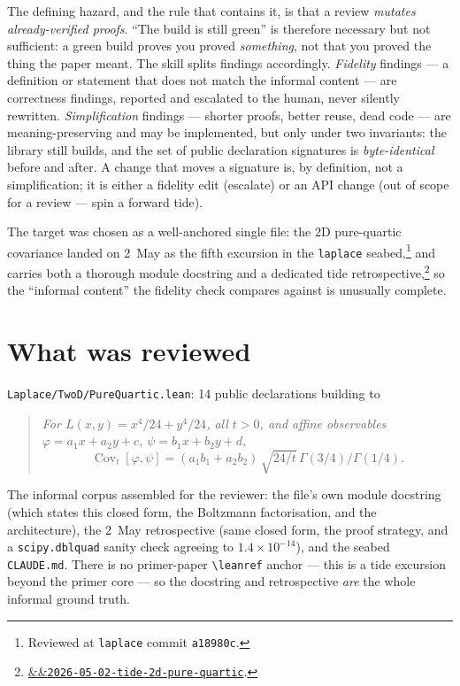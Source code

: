 \documentclass[11pt]{article}
\newcommand{\tideref}[2][]{\href{https://therisensea.org/tides/#2/}{\ifx&#1&\texttt{#2}\else#1\fi}}
\begin{document}
The defining hazard, and the rule that contains it, is that a review \emph{mutates
already-verified proofs}. ``The build is still green'' is therefore necessary but
not sufficient: a green build proves you proved \emph{something}, not that you
proved the thing the paper meant. The skill splits findings accordingly.
\emph{Fidelity} findings --- a definition or statement that does not match the
informal content --- are correctness findings, reported and escalated to the
human, never silently rewritten. \emph{Simplification} findings --- shorter
proofs, better reuse, dead code --- are meaning-preserving and may be implemented,
but only under two invariants: the library still builds, and the set of public
declaration signatures is \emph{byte-identical} before and after. A change that
moves a signature is, by definition, not a simplification; it is either a fidelity
edit (escalate) or an API change (out of scope for a review --- spin a forward
tide).

The target was chosen as a well-anchored single file: the 2D pure-quartic
covariance landed on 2~May as the fifth excursion in the \texttt{laplace}
seabed,\footnote{Reviewed at \texttt{laplace} commit \texttt{a18980c}.} and carries
both a thorough module docstring and a dedicated tide
retrospective,\footnote{\tideref{2026-05-02-tide-2d-pure-quartic}.} so the
``informal content'' the fidelity check compares against is unusually complete.

\section{What was reviewed}

\texttt{Laplace/TwoD/PureQuartic.lean}: 14 public declarations building to
\begin{quote}\itshape
For $L(x,y)=x^4/24+y^4/24$, all $t>0$, and affine observables
$\varphi=a_1x+a_2y+c$, $\psi=b_1x+b_2y+d$,
\[
  \operatorname{Cov}_t[\varphi,\psi]
  = (a_1 b_1 + a_2 b_2)\,\sqrt{24/t}\,\Gamma(3/4)/\Gamma(1/4).
\]
\end{quote}
The informal corpus assembled for the reviewer: the file's own module docstring
(which states this closed form, the Boltzmann factorisation, and the architecture),
the 2~May retrospective (same closed form, the proof strategy, and a
\texttt{scipy.dblquad} sanity check agreeing to $1.4\times10^{-14}$), and the
seabed \texttt{CLAUDE.md}. There is no primer-paper \texttt{\textbackslash leanref}
anchor --- this is a tide excursion beyond the primer core --- so the docstring and
retrospective \emph{are} the whole informal ground truth.
\end{document}
